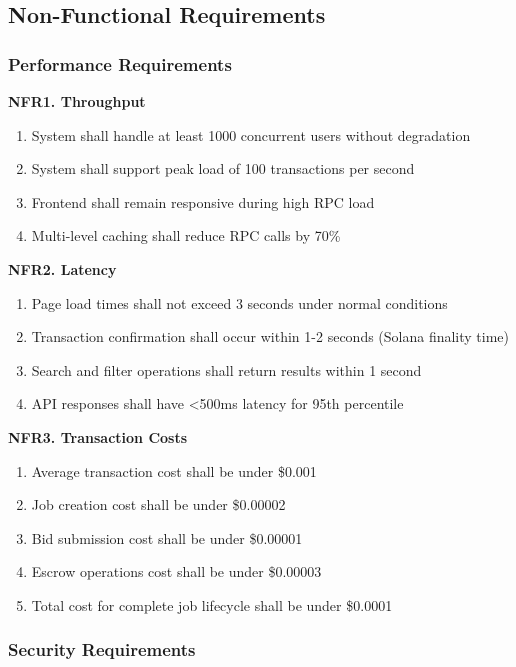 \documentclass[a4paper,13pt,twoside]{report}
\theoremstyle{definition}
\begin{document}
\subsection{Non-Functional Requirements}

\subsubsection{Performance Requirements}

\textbf{NFR1. Throughput}

\begin{enumerate}
    \item System shall handle at least 1000 concurrent users without degradation
    \item System shall support peak load of 100 transactions per second
    \item Frontend shall remain responsive during high RPC load
    \item Multi-level caching shall reduce RPC calls by 70\%
\end{enumerate}

\textbf{NFR2. Latency}

\begin{enumerate}
    \item Page load times shall not exceed 3 seconds under normal conditions
    \item Transaction confirmation shall occur within 1-2 seconds (Solana finality time)
    \item Search and filter operations shall return results within 1 second
    \item API responses shall have <500ms latency for 95th percentile
\end{enumerate}

\textbf{NFR3. Transaction Costs}

\begin{enumerate}
    \item Average transaction cost shall be under \$0.001
    \item Job creation cost shall be under \$0.00002
    \item Bid submission cost shall be under \$0.00001
    \item Escrow operations cost shall be under \$0.00003
    \item Total cost for complete job lifecycle shall be under \$0.0001
\end{enumerate}

\subsubsection{Security Requirements}
\end{document}
